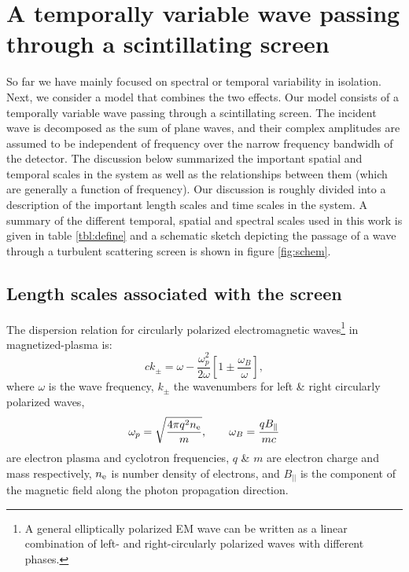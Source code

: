 \documentclass[fleqn,usenatbib]{mnras}
\begin{document}
	\section{A temporally variable wave passing through a scintillating screen}
	\label{sec:Screen}
	So far we have mainly focused on spectral or temporal variability in isolation. Next, we consider a model that combines the two effects. Our model consists of a temporally variable wave passing through a scintillating screen. The incident wave is decomposed as the sum of plane waves, and their complex amplitudes are assumed to be independent of frequency over the narrow frequency bandwidh of the detector.
	The discussion below summarized the important spatial and temporal scales in the system as well as the relationships between them (which are generally a function of frequency). Our discussion is roughly divided into a description of the important length scales and time scales in the system. A summary of the different temporal, spatial and spectral scales used in this work is given in table \ref{tbl:define} and a schematic sketch depicting the passage of a wave through a turbulent scattering screen is shown in figure \ref{fig:schem}.
	
	\subsection{Length scales associated with the screen}
	\label{sec:length}
	
	The dispersion relation for circularly polarized electromagnetic waves\footnote{A general elliptically polarized EM wave can be written as a linear combination of left- and right-circularly polarized waves with different phases.} in magnetized-plasma is:
	\begin{equation}
		c k_\pm = \omega - \frac{\omega_p^2}{2\omega}\left[ 1 \pm \frac{\omega_B}{\omega}\right],
		\label{EM-dispersion}
	\end{equation}
	where $\omega$ is the wave frequency, $k_\pm$ the wavenumbers for left \& right circularly polarized waves,
	\begin{equation}
		\omega_p = \sqrt{\frac{4\pi q^2 n_{\rm e}}{m}}, \quad\quad  \omega_B = \frac{q B_\parallel}{m c}
	\end{equation}
	are electron plasma and cyclotron frequencies, $q$ \& $m$ are electron charge and mass respectively, $n_{\rm e}$ is number density of electrons, and $B_{||}$ is the component of the magnetic field along the photon propagation direction.
	
\end{document}
